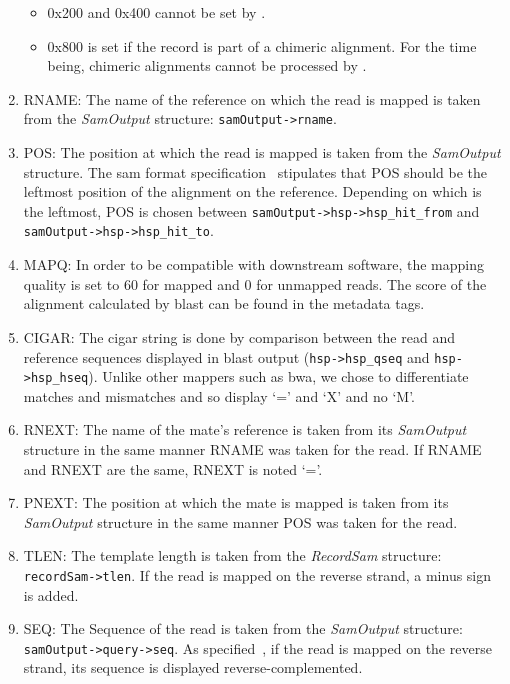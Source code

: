 \begin{enumerate}
\begin{itemize}
        \item 0x200 and 0x400 cannot be set by \blastobam{}.
        \item 0x800 is set if the record is part of a chimeric alignment.
        For the time being, chimeric alignments cannot be processed by \blastobam{}.
    \end{itemize}
    \item RNAME: The name of the reference on which the read is mapped is taken from the \emph{SamOutput} structure: \texttt{samOutput->\allowbreak rname}.
    \item POS: The position at which the read is mapped is taken from the \emph{SamOutput} structure.
    The \gls{sam} format specification~\cite{samspec} stipulates that POS should be the leftmost position of the alignment on the reference.
    Depending on which is the leftmost, POS is chosen between \texttt{samOutput->\allowbreak hsp->\allowbreak hsp\_hit\_from} and \texttt{samOutput->\allowbreak hsp->\allowbreak hsp\_hit\_to}.
    \item MAPQ: In order to be compatible with downstream software, the mapping quality is set to 60 for mapped and 0 for unmapped reads.
    The score of the alignment calculated by \gls{blast} can be found in the metadata tags.
    \item CIGAR: The \gls{cigar} string is done by comparison between the read and reference sequences displayed in \gls{blast} output (\texttt{hsp->\allowbreak hsp\_qseq} and \texttt{hsp->\allowbreak hsp\_hseq}).
    Unlike other mappers such as \gls{bwa}, we chose to differentiate matches and mismatches and so display `=' and `X' and no `M'.
    \item RNEXT: The name of the mate's reference is taken from its \emph{SamOutput} structure in the same manner RNAME was taken for the read. If RNAME and RNEXT are the same, RNEXT is noted `='.
    \item PNEXT: The position at which the mate is mapped is taken from its \emph{SamOutput} structure in the same manner POS was taken for the read.
    \item TLEN: The template length is taken from the \emph{RecordSam} structure: \texttt{recordSam->\allowbreak tlen}.
    If the read is mapped on the reverse strand, a minus sign is added.
    \item SEQ: The Sequence of the read is taken from the \emph{SamOutput} structure: \texttt{samOutput->\allowbreak query->\allowbreak seq}.
    As specified~\cite{samspec}, if the read is mapped on the reverse strand, its sequence is displayed reverse-complemented.

\end{enumerate}
